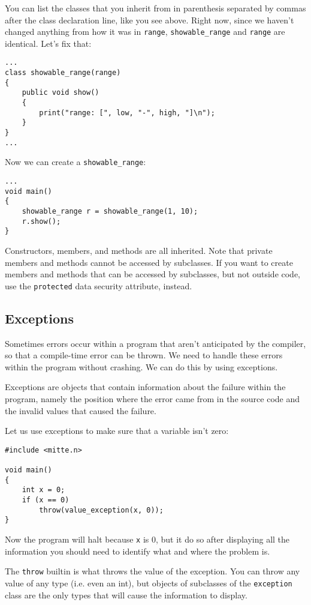 \documentclass[10pt,a4paper]{article}
\begin{document}
You can list the classes that you inherit from in parenthesis separated by commas after the class declaration line, like you see above. Right now, since we haven't changed anything from how it was in \verb|range|, \verb|showable_range| and \verb|range| are identical. Let's fix that:
\begin{verbatim}
...
class showable_range(range)
{
    public void show()
    {
        print("range: [", low, "-", high, "]\n");
    }
}
...
\end{verbatim}

Now we can create a \verb|showable_range|:
\begin{verbatim}
...
void main()
{
    showable_range r = showable_range(1, 10);
    r.show();
}
\end{verbatim}

Constructors, members, and methods are all inherited. Note that private members and methods cannot be accessed by subclasses. If you want to create members and methods that can be accessed by subclasses, but not outside code, use the \verb|protected| data security attribute, instead.

\newpage





\subsection{Exceptions}
Sometimes errors occur within a program that aren't anticipated by the compiler, so that a compile-time error can be thrown. We need to handle these errors within the program without crashing. We can do this by using exceptions.

Exceptions are objects that contain information about the failure within the program, namely the position where the error came from in the source code and the invalid values that caused the failure.

Let us use exceptions to make sure that a variable isn't zero:
\begin{verbatim}
#include <mitte.n>

void main()
{
    int x = 0;
    if (x == 0)
        throw(value_exception(x, 0));
}
\end{verbatim}

Now the program will halt because \verb|x| is 0, but it do so after displaying all the information you should need to identify what and where the problem is.

The \verb|throw| builtin is what throws the value of the exception. You can throw any value of any type (i.e. even an int), but objects of subclasses of the \verb|exception| class are the only types that will cause the information to display.
\end{document}
